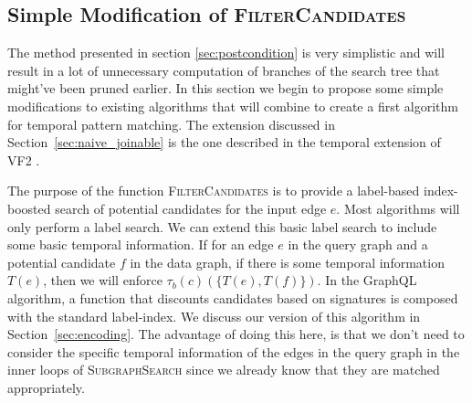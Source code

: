 \subsection{Simple Modification of \textsc{FilterCandidates}}
\label{sec:naive_filter_candidates}

The method presented in section \ref{sec:postcondition} is very simplistic and
will result in a lot of unnecessary computation of branches of the search tree
that might've been pruned earlier. In this section we begin to propose some
simple modifications to existing algorithms that will combine to create a first
algorithm for temporal pattern matching. The extension discussed in
Section~\ref{sec:naive_joinable} is the one described in the temporal extension
of VF2 \cite{2016-arXiv-TemporalIso}.

The purpose of the function \textsc{FilterCandidates} is to provide a
label-based index-boosted search of potential candidates for the input edge
$e$. Most algorithms will only perform a label search. We can
extend this basic label search to include some basic temporal information. If
for an edge $e$ in the query graph and a potential candidate $f$ in the data
graph, if there is some temporal information $T(e)$, then we will enforce
$\tau_b(c)(\{T(e), T(f)\})$. In the GraphQL algorithm, a function that discounts
candidates based on signatures is composed with the standard label-index. We
discuss our version of this algorithm in Section~\ref{sec:encoding}. The
advantage of doing this here, is that we don't need to consider the specific
temporal information of the edges in the query graph in the inner loops of
\textsc{SubgraphSearch} since we already know that they are matched
appropriately.


